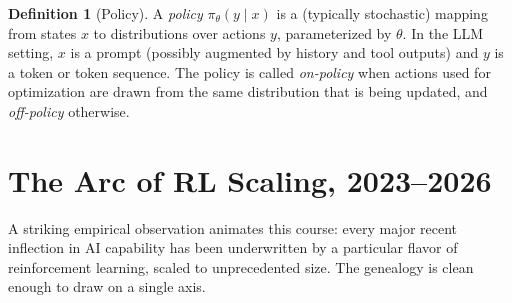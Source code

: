 \documentclass[11pt,a4paper]{article}
\theoremstyle{definition}
\newtheorem{definition}{Definition}[section]
\theoremstyle{plain}
\begin{document}
\begin{definition}[Policy]
A \emph{policy} $\pi_\theta(y \mid x)$ is a (typically stochastic) mapping from states $x$ to distributions over actions $y$, parameterized by $\theta$. In the LLM setting, $x$ is a prompt (possibly augmented by history and tool outputs) and $y$ is a token or token sequence. The policy is called \emph{on-policy} when actions used for optimization are drawn from the same distribution that is being updated, and \emph{off-policy} otherwise.
\end{definition}

\section{The Arc of RL Scaling, 2023--2026}

A striking empirical observation animates this course: every major recent inflection in AI capability has been underwritten by a particular flavor of reinforcement learning, scaled to unprecedented size. The genealogy is clean enough to draw on a single axis.

\begin{center}
\end{center}
\end{document}
